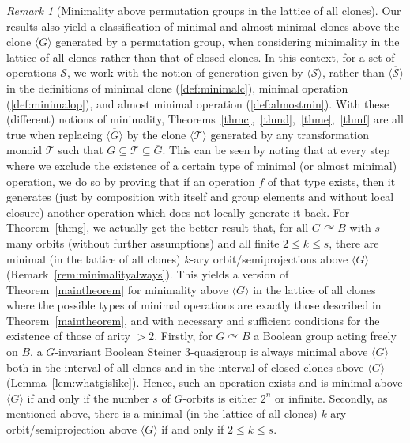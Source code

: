 \documentclass{article}
\theoremstyle{remark}
\newtheorem{remark}[theorem]{Remark}
\theoremstyle{definition}
\def\acts{\curvearrowright}
\begin{document}
\begin{remark}[Minimality above permutation groups in the lattice of all clones]\label{rem:oknoclosure} Our results also yield a classification of minimal and almost minimal clones above the clone $\langle G \rangle$ generated by a permutation group, when considering minimality in the lattice of all clones rather than that of closed clones. In this context, for a set of operations $\mathcal{S}$, we work with the notion of generation given by $\langle \mathcal{S} \rangle$, rather than $\overline{\langle \mathcal{S} \rangle}$ in the definitions of minimal clone (\ref{def:minimalc}), minimal operation (\ref{def:minimalop}), and almost minimal operation (\ref{def:almostmin}). With these (different) notions of minimality, Theorems~\ref{thmc},~\ref{thmd},~\ref{thme},~\ref{thmf} are all true when replacing $\overline{\langle G \rangle}$ by the clone $\langle \mathcal{T}\rangle$ generated by any transformation monoid $\mathcal{T}$ such that $G\subseteq \mathcal{T}\subseteq\overline{G}$. This can be seen by noting that at every step where we exclude the existence of a certain type of minimal (or almost minimal) operation, we do so by proving that if an operation $f$ of that type exists, then it generates (just by composition with itself and group elements and without local closure) another operation which does not locally generate it back. For Theorem~\ref{thmg}, we actually get the better result that, for all $G\acts B$ with $s$-many orbits (without further assumptions) and all finite $2\leq k\leq s$, there are minimal (in the lattice of all clones) $k$-ary orbit\-/semiprojections above $\langle G\rangle$ (Remark~\ref{rem:minimalityalways}). This yields a version of Theorem~\ref{maintheorem} for minimality above $\langle G\rangle$ in the lattice of all clones where the possible types of minimal operations are exactly those described in Theorem~\ref{maintheorem}, and with necessary and sufficient conditions for the existence of those of arity $>2$. Firstly, for $G\acts B$ a Boolean group acting freely on $B$, a $G$-invariant Boolean Steiner $3$-quasigroup is always minimal above $\langle G\rangle$ both in the interval of all clones and in the interval of closed clones above $\langle G\rangle$ (Lemma~\ref{lem:whatgislike}). Hence, such an operation exists and is minimal above $\langle G\rangle$ if and only if the number $s$ of $G$-orbits is either $2^n$ or infinite. Secondly, as mentioned above, there is a minimal (in the lattice of all clones) $k$-ary orbit\-/semiprojection above $\langle G\rangle$ if and only if $2\leq k\leq s$.
\end{remark}
\end{document}
